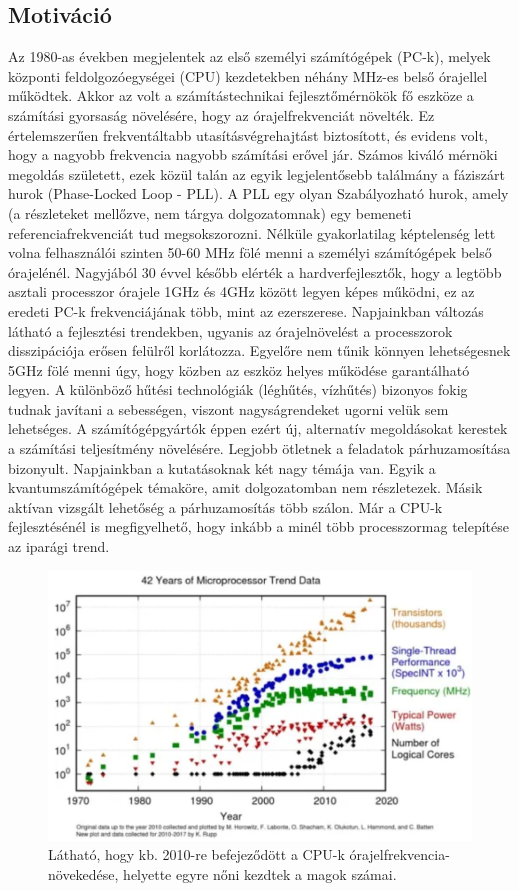 \subsection{Motiváció}
Az 1980-as években megjelentek az első személyi számítógépek (PC-k), melyek központi feldolgozóegységei (CPU) kezdetekben néhány MHz-es belső órajellel működtek. Akkor az volt a számítástechnikai fejlesztőmérnökök fő eszköze a számítási gyorsaság növelésére, hogy az órajelfrekvenciát növelték. Ez értelemszerűen frekventáltabb utasításvégrehajtást biztosított, és evidens volt, hogy a nagyobb frekvencia nagyobb számítási erővel jár. Számos kiváló mérnöki megoldás született, ezek közül talán az egyik legjelentősebb találmány a fáziszárt hurok (Phase-Locked Loop - PLL). A PLL egy olyan Szabályozható hurok, amely (a részleteket mellőzve, nem tárgya dolgozatomnak) egy bemeneti referenciafrekvenciát tud megsokszorozni. Nélküle gyakorlatilag képtelenség lett volna felhasználói szinten 50-60 MHz fölé menni a személyi számítógépek belső órajelénél. Nagyjából 30 évvel később elérték a hardverfejlesztők, hogy a legtöbb asztali processzor órajele 1GHz és 4GHz között legyen képes működni, ez az eredeti PC-k frekvenciájának több, mint az ezerszerese. Napjainkban változás látható a fejlesztési trendekben, ugyanis az órajelnövelést a processzorok disszipációja erősen felülről korlátozza. Egyelőre nem tűnik könnyen lehetségesnek 5GHz fölé menni úgy, hogy közben az eszköz helyes működése garantálható legyen. A különböző hűtési technológiák (léghűtés, vízhűtés) bizonyos fokig tudnak javítani a sebességen, viszont nagyságrendeket ugorni velük sem lehetséges. 
A számítógépgyártók éppen ezért új, alternatív megoldásokat kerestek a számítási teljesítmény növelésére. Legjobb ötletnek a feladatok párhuzamosítása bizonyult. Napjainkban a kutatásoknak két nagy témája van. Egyik a kvantumszámítógépek témaköre, amit dolgozatomban nem részletezek. Másik aktívan vizsgált lehetőség a párhuzamosítás több szálon. Már a CPU-k fejlesztésénél is megfigyelhető, hogy inkább a minél több processzormag telepítése az iparági trend.

\begin{figure}[ht!]
	\centering
	\includegraphics[width=150mm, keepaspectratio]{figures/CPU-cores-trend.png}
	\caption{Látható, hogy kb. 2010-re befejeződött a CPU-k órajelfrekvencia-növekedése, helyette egyre nőni kezdtek a magok számai. \cite{CPUcores} }
\end{figure}

